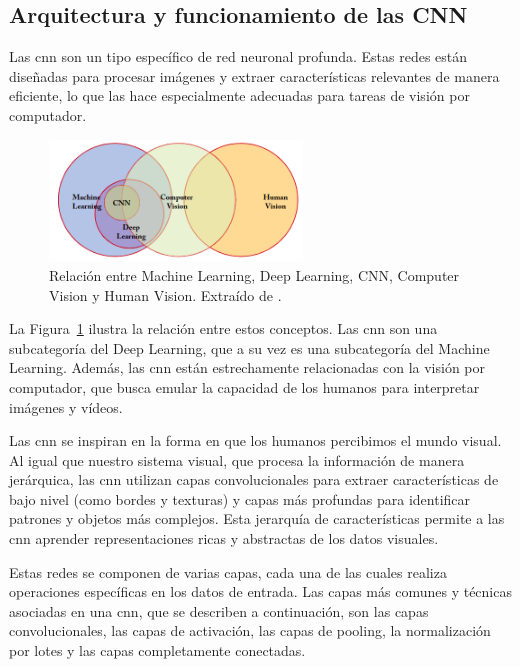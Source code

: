 \documentclass[11pt,spanish,listoffigures,listoftables]{tfgetsinf}
\begin{document}
\subsection{Arquitectura y funcionamiento de las CNN} \label{sec:arquitectura_cnn}
Las \gls{cnn} son un tipo específico de red neuronal profunda. Estas redes están diseñadas para procesar imágenes y extraer características relevantes de manera eficiente, lo que las hace especialmente adecuadas para tareas de visión por computador.

\begin{figure}[H]
   \centering
   \includegraphics[width=0.6\textwidth]{images/estado_del_arte/diagrama_de_Venn_inteligencia_artificial.png}
   \caption[Relación entre Machine Learning, Deep Learning, CNN, Computer Vision y Human Vision]{Relación entre Machine Learning, Deep Learning, CNN, Computer Vision y Human Vision. Extraído de \cite[fig. 1.3, p. ~7]{khan2018guide}.}
   \label{fig:diagrama_de_Venn_inteligencia_artificial}
\end{figure}

La Figura~\ref{fig:diagrama_de_Venn_inteligencia_artificial} ilustra la relación entre estos conceptos. Las \gls{cnn} son una subcategoría del Deep Learning, que a su vez es una subcategoría del Machine Learning. Además, las \gls{cnn} están estrechamente relacionadas con la visión por computador, que busca emular la capacidad de los humanos para interpretar imágenes y vídeos.

Las \gls{cnn} se inspiran en la forma en que los humanos percibimos el mundo visual. Al igual que nuestro sistema visual, que procesa la información de manera jerárquica, las \gls{cnn} utilizan capas convolucionales para extraer características de bajo nivel (como bordes y texturas) y capas más profundas para identificar patrones y objetos más complejos. Esta jerarquía de características permite a las \gls{cnn} aprender representaciones ricas y abstractas de los datos visuales.

Estas redes se componen de varias capas, cada una de las cuales realiza operaciones específicas en los datos de entrada. Las capas más comunes y técnicas asociadas en una \gls{cnn}, que se describen a continuación, son las capas convolucionales, las capas de activación, las capas de pooling, la normalización por lotes y las capas completamente conectadas.
\end{document}
